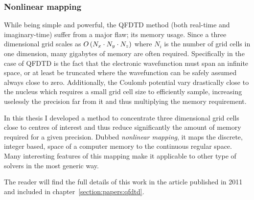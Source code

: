 \subsubsection{Nonlinear mapping}
\label{section:tools:qfdtd:mapping}

While being simple and powerful, the QFDTD method (both real-time and
imaginary-time) suffer from a major flaw; its memory usage. Since a three
dimensional grid scales as $O\left( N_x \cdot N_y \cdot N_z \right)$ where $N_i$ is the
number of grid cells in one dimension, many gigabytes of memory are often
required. Specifically in the case of QFDTD is the fact that the electronic
wavefunction must span an infinite space, or at least be truncated where
the wavefunction can be safely assumed always close to zero. Additionally,
the Coulomb potential vary drastically close to the nucleus which requires
a small grid cell size to efficiently sample, increasing uselessly the precision
far from it and thus multiplying the memory requirement.

In this thesis I developed a method to concentrate three dimensional grid cells
close to centres of interest and thus reduce significantly the amount of memory
required for a given precision. Dubbed \textit{nonlinear mapping}, it maps the
discrete, integer based, space of a computer memory to the continuous regular
space. Many interesting features of this mapping make it applicable to other
type of solvers in the most generic way.

The reader will find the full details of this work in the article published
in 2011 and included in chapter~\ref{section:papers:qfdtd}.



